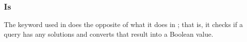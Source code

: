 \subsubsection{Is}

The  keyword used in \Poetry{} does the opposite of what it does
in \Law{}; that is, it checks if a query has any solutions and converts
that result into a Boolean value.

\begin{bnf*}
\end{bnf*}

\begin{figure}[H]
    \centering
    \parbox[t]{0.4\linewidth}{
        \begin{prooftree}
        \end{prooftree}
    }
    \parbox[t]{0.4\linewidth}{
        \begin{prooftree}
        \end{prooftree}
    }
\end{figure}

